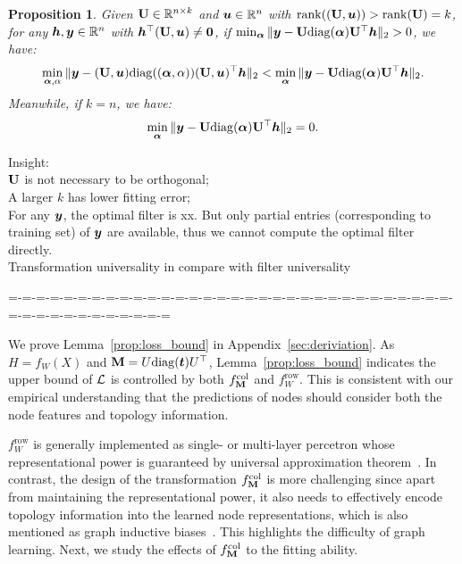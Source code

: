\documentclass{article} %
\def\valpha{{\bm\alpha}}
\newtheorem{proposition}{\textbf{Proposition}} %
\begin{document}
	
	\begin{proposition}
		\label{prop:appro}
		Given ${\mathbf{U}}\in{\mathbb{R}}^{n\times k}$ and ${\bm{u}}\in{\mathbb{R}}^n$ with $\mathrm{rank}(({\mathbf{U}},{\bm{u}}))>\mathrm{rank}({\mathbf{U}})=k$, for any ${\bm{h}},{\bm{y}}\in{\mathbb{R}}^n$ with ${\bm{h}}^{\top}({\mathbf{U}},{\bm{u}})\neq\mathbf 0$, if $\min_{\valpha}\|\vy-\rmU\mathrm{diag}(\valpha)\rmU^{\top}\vh\|_2>0$, we have:
		\begin{equation}
			\label{equ:appro1}
			\begin{aligned}
				\min_{\valpha,\alpha}\|\vy-(\rmU,\vu)\mathrm{diag}((\valpha,\alpha))(\rmU,\vu)^{\top}\vh\|_2<\min_{\valpha}\|\vy-\rmU\mathrm{diag}(\valpha)\rmU^{\top}\vh\|_2.
			\end{aligned}
		\end{equation}
		Meanwhile, if $k=n$, we have:
		\begin{equation}
			\label{equ:appro2}
			\begin{aligned}
				\min_{\valpha}\|\vy-\rmU\mathrm{diag}(\valpha)\rmU^{\top}\vh\|_2=0.
			\end{aligned}
		\end{equation}    
	\end{proposition}
	Insight:\\
	${\mathbf{U}}$ is not necessary to be orthogonal;\\
	A larger $k$ has lower fitting error;\\
	For any ${\bm{y}}$, the optimal filter is xx. But only partial entries (corresponding to training set) of ${\bm{y}}$ are available, thus we cannot compute the optimal filter directly.\\
	Transformation universality in compare with filter universality
	
	=-=-=-=-=-=-=-=-=-=-=-=-=-=-=-=-=-=-=-=-=-=-=-=-=-=-=-=-=-=-=-=-=-=-=-=-=-=-=-=-=-=-=-=
	
	We prove Lemma~\ref{prop:loss_bound} in Appendix~\ref{sec:deriviation}.
	As $H=f_W(X)$ and ${\mathbf{M}}=U\mathrm{diag}({\bm{t}})U^{\top}$, Lemma~\ref{prop:loss_bound} indicates the upper bound of ${\mathcal{L}}$ is controlled by both $f_{{\mathbf{M}}}^{\mathrm{col}}$ and $f_W^{\mathrm{row}}$.
	This is consistent with our empirical understanding that the predictions of nodes should consider both the node features and topology information.
	
	$f_W^{\mathrm{row}}$ is generally implemented as single- or multi-layer percetron whose representational power is guaranteed by universal approximation theorem~\citep{hornik1989multilayer,cybenko1989approximation}.
	In contrast, the design of the transformation $f_{{\mathbf{M}}}^{\mathrm{col}}$ is more challenging since apart from maintaining the representational power, it also needs to effectively encode topology information into the learned node representations, which is also mentioned as graph inductive biases~\citep{ma2023graph}.
	This highlights the difficulty of graph learning.
	Next, we study the effects of $f_{{\mathbf{M}}}^{\mathrm{col}}$ to the fitting ability.
	
\end{document}
